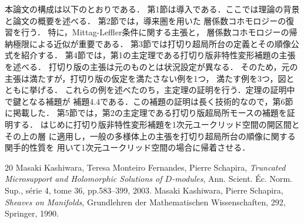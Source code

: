 ﻿\documentclass[a4paper]{jsarticle}
\theoremstyle{definition}
\numberwithin{equation}{section}
\theoremstyle{mystyle}
\begin{document}
\begin{gaiyo}
  本論文の構成は以下のとおりである．
  第1節は導入である．ここでは理論の背景と論文の概要を述べる．
  第2節では，導来圏を用いた
  層係数コホモロジーの復習を行う．
  特に，Mittag-Leffler条件に関する主張と，
  層係数コホモロジーの帰納極限による近似が重要である．
  第3節では打切り超局所台の定義とその順像公式を紹介する．
  第4節では，第1の主定理である打切り版非特性変形補題の主張を述べる．
  打切り版の主張は元のものとは状況設定が異なる．
  そのため，元の主張は満たすが，打切り版の仮定を満たさない例を1つ，
  満たす例を3つ，図とともに挙げる．
  これらの例を述べたのち，主定理の証明を行う．定理の証明中で鍵となる補題が
  補題4.4である．この補題の証明は長く技術的なので，第6節に掲載した．
  第5節では，第2の主定理である打切り版超局所モースの補題を証明する．
  はじめに打切り版非特性変形補題を1次元ユークリッド空間の開区間とその上の層
  に適用し，一般の多様体上の主張を打切り超局所台の順像に関する関手的性質を
  用いて1次元ユークリッド空間の場合に帰着させる．
\end{gaiyo}
\vspace{-10pt}
\begin{thebibliography}{20}
\vspace{-5pt}
   Masaki Kashiwara, Teresa Monteiro Fernandes, Pierre Schapira, 
    \textit{Truncated Microsupport and Holomorphic Solutions 
    of \(D\)-modules}, 
    Ann. Scient. \'Ec. Norm. Sup., s\'erie 4, tome 36, 
    pp.583--399, 2003.
   Masaki Kashiwara, Pierre Schapira, 
    \textit{Sheaves on Manifolds}, 
    Grundlehren der Mathematischen Wissenschaften, 292, Springer, 1990.
\end{thebibliography}
\end{document}
